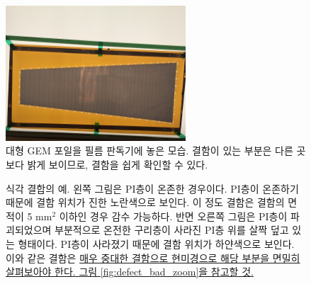 \documentclass[11pt]{article}
\begin{document}
\begin{figure}[htb]
  \centering
  \includegraphics[width=0.60\textwidth]{Light_Board.jpg}
  \caption[대형 GEM 포일을 필름 판독기에 놓은 모습]{대형 GEM 포일을 필름 판독기에 놓은 모습. 결함이 있는 부분은 다른 곳보다 밝게 보이므로, 결함을 쉽게 확인할 수 있다.}
  \label{fig:light_board}
\end{figure}

\begin{figure}[htb]
  \centering
  \caption[식각 결합의 예]{식각 결합의 예. 왼쪽 그림은 PI층이 온존한 경우이다. PI층이 온존하기 때문에 결함 위치가 진한 노란색으로 보인다. 이 정도 결함은 결함의 면적이 5 mm$^2$ 이하인 경우 감수 가능하다. 반면 오른쪽 그림은 PI층이 파괴되었으며 부분적으로 온전한 구리층이 사라진 PI층 위를 살짝 덮고 있는 형태이다. PI층이 사라졌기 때문에 결함 위치가 하얀색으로 보인다. 이와 같은 결함은 \uline{매우 중대한 결함으로 현미경으로 해당 부분을 면밀히 살펴보아야 한다. 그림 \protect\ref{fig:defect_bad_zoom}을 참고할 것.}}
  \label{fig:example_defect}
\end{figure}
\end{document}
